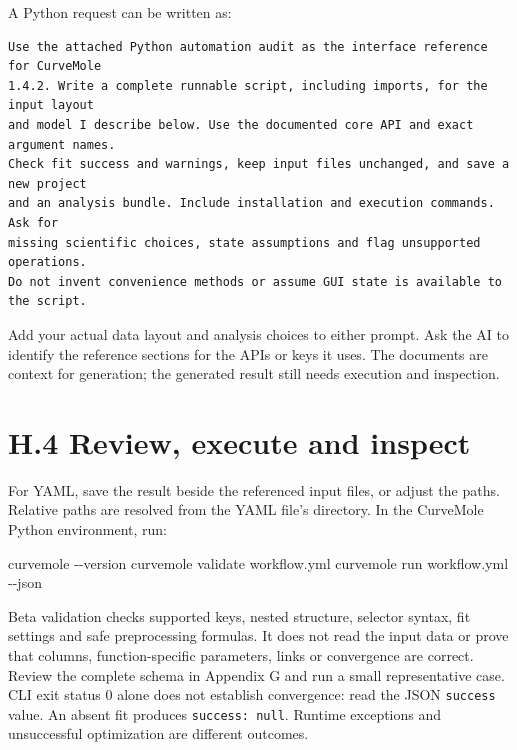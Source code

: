 \documentclass[
  10pt,
  a4paper,
  oneside]{scrreprt}
\newenvironment{Shaded}{}{}
\newcommand{\ExtensionTok}[1]{#1}
\newcommand{\NormalTok}[1]{#1}
\begin{document}
A Python request can be written as:

\begin{verbatim}
Use the attached Python automation audit as the interface reference for CurveMole
1.4.2. Write a complete runnable script, including imports, for the input layout
and model I describe below. Use the documented core API and exact argument names.
Check fit success and warnings, keep input files unchanged, and save a new project
and an analysis bundle. Include installation and execution commands. Ask for
missing scientific choices, state assumptions and flag unsupported operations.
Do not invent convenience methods or assume GUI state is available to the script.
\end{verbatim}

Add your actual data layout and analysis choices to either prompt. Ask
the AI to identify the reference sections for the APIs or keys it uses.
The documents are context for generation; the generated result still
needs execution and inspection.

\hypertarget{h.4-review-execute-and-inspect}{%
\section{H.4 Review, execute and
inspect}\label{h.4-review-execute-and-inspect}}

For YAML, save the result beside the referenced input files, or adjust
the paths. Relative paths are resolved from the YAML file's directory.
In the CurveMole Python environment, run:

\begin{Shaded}
\begin{Highlighting}[]
\ExtensionTok{curvemole}\NormalTok{ {-}{-}version}
\ExtensionTok{curvemole}\NormalTok{ validate workflow.yml}
\ExtensionTok{curvemole}\NormalTok{ run workflow.yml {-}{-}json}
\end{Highlighting}
\end{Shaded}

Beta validation checks supported keys, nested structure, selector
syntax, fit settings and safe preprocessing formulas. It does not read
the input data or prove that columns, function-specific parameters,
links or convergence are correct. Review the complete schema in Appendix
G and run a small representative case. CLI exit status 0 alone does not
establish convergence: read the JSON \texttt{success} value. An absent
fit produces \texttt{success:\ null}. Runtime exceptions and
unsuccessful optimization are different outcomes.
\end{document}
